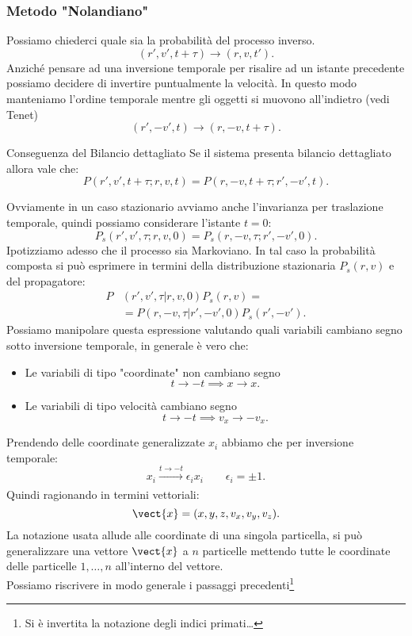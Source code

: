 \subsubsection{Metodo "Nolandiano"}%
\label{subsub:Metodo "Nolandiano"}
Possiamo chiederci quale sia la probabilità del processo inverso.
\[
    (r',v',t+\tau) \to (r,v,t') 
.\] 
Anziché pensare ad una inversione temporale per risalire ad un istante precedente possiamo decidere di invertire puntualmente la velocità. In questo modo manteniamo l'ordine temporale mentre gli oggetti si muovono all'indietro (vedi Tenet)
\[
    (r',-v',t) \to (r,-v,t+\tau) 
.\] 
\begin{redbox}{Conseguenza del Bilancio dettagliato}
    Se il sistema presenta bilancio dettagliato allora vale che:
    \[
    P(r',v',t+\tau; r,v,t) = P(r,-v,t+\tau; r',-v',t)
    .\] 
\end{redbox}
\noindent
Ovviamente in un caso stazionario avviamo anche l'invarianza per traslazione temporale, quindi possiamo considerare l'istante $t=0$:
\[
    P_s(r',v',\tau; r,v,0) = P_s(r,-v,\tau; r',-v',0)
.\] 
Ipotizziamo adesso che il processo sia Markoviano. In tal caso la probabilità composta si può esprimere in termini della distribuzione stazionaria $P_s(r,v)$ e del propagatore:
\[\begin{aligned}
    P&(r',v',\tau|r,v,0) P_s(r,v) =\\
     & =P(r,-v,\tau|r',-v',0) P_s(r',-v')
.\end{aligned}\]
Possiamo manipolare questa espressione valutando quali variabili cambiano segno sotto inversione temporale, in generale è vero che:
\begin{itemize}
    \item Le variabili di tipo "coordinate" non cambiano segno
	\[
	    t\to -t \implies  x \to x
	.\] 
    \item Le variabili di tipo velocità cambiano segno
	\[
	    t\to -t \implies  v_x \to -v_x
	.\] 
\end{itemize}
Prendendo delle coordinate generalizzate $x_i$ abbiamo che per inversione temporale:
\[
    x_i \xrightarrow[]{t\to -t} \epsilon_i x_i \qquad \epsilon_i = \pm 1
.\] 
Quindi ragionando in termini vettoriali:
\[
    \vect{x}  = (x,y,z,v_x,v_y,v_z) 
.\] 
La notazione usata allude alle coordinate di una singola particella, si può generalizzare una vettore $\vect{x}$ a $n$ particelle mettendo tutte le coordinate delle particelle $1,\ldots,n$ all'interno del vettore.\\
Possiamo riscrivere in modo generale i passaggi precedenti\footnote{Si è invertita la notazione degli indici primati\ldots}
